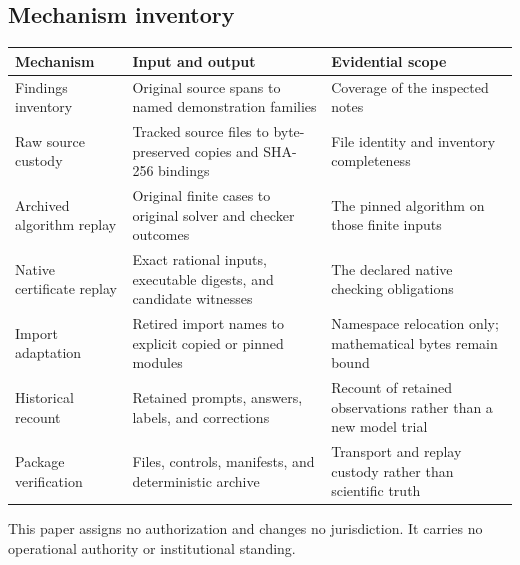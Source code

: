 \documentclass[
  11pt,
]{article}
\begin{document}
\subsection{Mechanism inventory}\label{mechanism-inventory}

\begin{longtable}[]{@{}
  >{\raggedright\arraybackslash}p{}
  >{\raggedright\arraybackslash}p{}
  >{\raggedright\arraybackslash}p{}@{}}
\toprule\noalign{}
\begin{minipage}[b]{\linewidth}\raggedright
Mechanism
\end{minipage} & \begin{minipage}[b]{\linewidth}\raggedright
Input and output
\end{minipage} & \begin{minipage}[b]{\linewidth}\raggedright
Evidential scope
\end{minipage} \\
\midrule\noalign{}
\endhead
\bottomrule\noalign{}
\endlastfoot
Findings inventory & Original source spans to named demonstration
families & Coverage of the inspected notes \\
Raw source custody & Tracked source files to byte-preserved copies and
SHA-256 bindings & File identity and inventory completeness \\
Archived algorithm replay & Original finite cases to original solver and
checker outcomes & The pinned algorithm on those finite inputs \\
Native certificate replay & Exact rational inputs, executable digests,
and candidate witnesses & The declared native checking obligations \\
Import adaptation & Retired import names to explicit copied or pinned
modules & Namespace relocation only; mathematical bytes remain bound \\
Historical recount & Retained prompts, answers, labels, and corrections
& Recount of retained observations rather than a new model trial \\
Package verification & Files, controls, manifests, and deterministic
archive & Transport and replay custody rather than scientific truth \\
\end{longtable}

This paper assigns no authorization and changes no jurisdiction. It
carries no operational authority or institutional standing.
\end{document}
